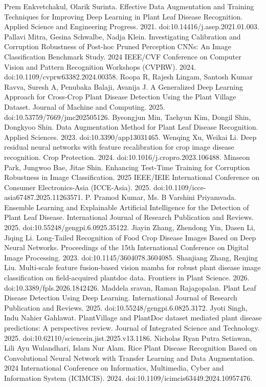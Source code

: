 Prem Enkvetchakul, Olarik Surinta. Effective Data Augmentation and Training Techniques for Improving Deep Learning in Plant Leaf Disease Recognition. Applied Science and Engineering Progress. 2021. doi:10.14416/j.asep.2021.01.003.
 Pallavi Mitra, Gesina Schwalbe, Nadja Klein. Investigating Calibration and Corruption Robustness of Post-hoc Pruned Perception CNNs: An Image Classification Benchmark Study. 2024 IEEE/CVF Conference on Computer Vision and Pattern Recognition Workshops (CVPRW). 2024. doi:10.1109/cvprw63382.2024.00358.
 Roopa R, Rajesh Lingam, Santosh Kumar Ravva, Suresh A, Penubaka Balaji, Avanija J. A Generalized Deep Learning Approach for Cross-Crop Plant Disease Detection Using the Plant Village Dataset. Journal of Machine and Computing. 2025. doi:10.53759/7669/jmc202505126.
 Byeongjun Min, Taehyun Kim, Dongil Shin, Dongkyoo Shin. Data Augmentation Method for Plant Leaf Disease Recognition. Applied Sciences. 2023. doi:10.3390/app13031465.
 Wenqing Xu, Weikai Li. Deep residual neural networks with feature recalibration for crop image disease recognition. Crop Protection. 2024. doi:10.1016/j.cropro.2023.106488.
 Minseon Park, Jungwoo Bae, Jitae Shin. Enhancing Test-Time Training for Corruption Robustness in Image Classification. 2025 IEEE/IEIE International Conference on Consumer Electronics-Asia (ICCE-Asia). 2025. doi:10.1109/icce-asia67487.2025.11263571.
 P. Pramod Kumar, Ms. B Varshini Priyamvada. Ensemble Learning and Explainable Artificial Intelligence for the Detection of Plant Leaf Disease. International Journal of Research Publication and Reviews. 2025. doi:10.55248/gengpi.6.0925.35122.
 Jiayin Zhang, Zhendong Yin, Dasen Li, Jiqing Li. Long-Tailed Recognition of Food Crop Disease Images Based on Deep Neural Networks. Proceedings of the 15th International Conference on Digital Image Processing. 2023. doi:10.1145/3604078.3604085.
 Shanjiang Zhang, Renjing Liu. Multi-scale feature fusion-based vision mamba for robust plant disease image classification on field-acquired plantdoc data. Frontiers in Plant Science. 2026. doi:10.3389/fpls.2026.1842426.
 Maddela sravan, Raman Rajagopalan. Plant Leaf Disease Detection Using Deep Learning. International Journal of Research Publication and Reviews. 2025. doi:10.55248/gengpi.6.0825.3172.
 Jyoti Singh, Indu Nahier Gahlawat. PlantVillage and PlantDoc dataset mediated plant disease predictions: A perspectives review. Journal of Integrated Science and Technology. 2025. doi:10.62110/sciencein.jist.2025.v13.1186.
 Nicholas Ryan Putra Setiawan, Lili Ayu Wulandhari, Islam Nur Alam. Rice Plant Disease Recognition Based on Convolutional Neural Network with Transfer Learning and Data Augmentation. 2024 International Conference on Informatics, Multimedia, Cyber and Information System (ICIMCIS). 2024. doi:10.1109/icimcis63449.2024.10957476.


